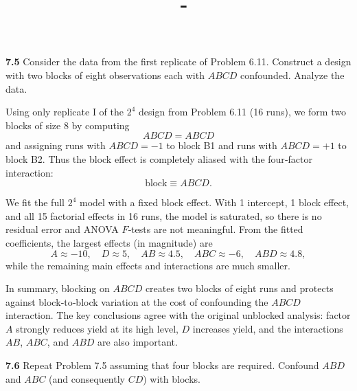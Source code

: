\documentclass[answers,12pt,addpoints]{exam}
\author{\name}
\title{\course \ - \assignment}
\begin{document}
\maketitle

\textbf{7.5}
Consider the data from the first replicate of Problem 6.11. Construct a design with two blocks of eight observations each with $ABCD$ confounded. Analyze the data.

\begin{solution}
Using only replicate I of the $2^4$ design from Problem 6.11 (16 runs), we form two blocks of size 8 by computing
\[
ABCD = A B C D
\]
and assigning runs with $ABCD=-1$ to block B1 and runs with $ABCD=+1$ to block B2. Thus the block effect is completely aliased with the four‑factor interaction:
\[
\text{block} \equiv ABCD.
\]

We fit the full $2^4$ model with a fixed block effect. With 1 intercept, 1 block effect, and all 15 factorial effects in 16 runs, the model is saturated, so there is no residual error and ANOVA $F$‑tests are not meaningful. From the fitted coefficients, the largest effects (in magnitude) are
\[
A \approx -10,\quad D \approx 5,\quad AB \approx 4.5,\quad ABC \approx -6,\quad ABD \approx 4.8,
\]
while the remaining main effects and interactions are much smaller.

In summary, blocking on $ABCD$ creates two blocks of eight runs and protects against block‑to‑block variation at the cost of confounding the $ABCD$ interaction. The key conclusions agree with the original unblocked analysis: factor $A$ strongly reduces yield at its high level, $D$ increases yield, and the interactions $AB$, $ABC$, and $ABD$ are also important.
\end{solution}

\bigskip

\textbf{7.6}
Repeat Problem 7.5 assuming that four blocks are required. Confound $ABD$ and $ABC$ (and consequently $CD$) with blocks.
\end{document}
